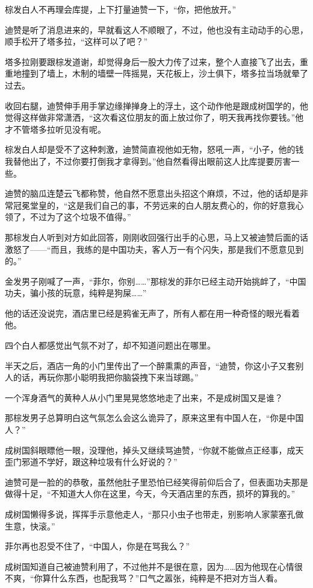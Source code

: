 棕发白人不再理会库提，上下打量迪赞一下，“你，把他放开。”

迪赞是听了消息进来的，早就看这人不顺眼了，不过，他也没有主动动手的心思，顺手松开了塔多拉，“这样可以了吧？”

塔多拉刚要跟棕发道谢，却觉得身后一股大力传了过来，整个人直接飞了出去，重重地撞到了墙上，木制的墙壁一阵摇晃，天花板上，沙土俱下，塔多拉当场就晕了过去。

收回右腿，迪赞伸手用手掌边缘掸掸身上的浮土，这个动作他是跟成树国学的，他觉得这样做非常潇洒，“这次看这位朋友的面上放过你了，明天我再找你要钱。”他才不管塔多拉听见没有呢。

棕发白人却是受不了这种刺激，迪赞简直视他如无物，怒吼一声，“小子，他的钱我替他出了，不过你要打倒我才拿得到。”他自然看得出眼前这人比库提要厉害一些。

迪赞的脑瓜连楚云飞都称赞，他自然不愿意出头招这个麻烦，不过，他的话却是非常冠冕堂皇的，“这是我们自己的事，不劳远来的白人朋友费心的，你的好意我心领了，不过为了这个垃圾不值得。”

那棕发白人听到对方如此回答，刚刚收回强行出手的心思，马上又被迪赞后面的话激怒了——“而且，我练的是中国功夫，客人万一有个闪失，那是我们不愿意见到的。”

金发男子刚喊了一声，“菲尔，你别……”那棕发的菲尔已经主动开始挑衅了，“中国功夫，骗小孩的玩意，纯粹是狗屎……”

他的话还没说完，酒店里已经是鸦雀无声了，所有人都在用一种奇怪的眼光看着他。

四个白人都感觉出气氛不对了，却不知道问题出在哪里。

半天之后，酒店一角的小门里传出了一个醉熏熏的声音，“迪赞，你这小子又套别人的话，再玩你那小聪明我把你脑袋拽下来当球踢。”

一个浑身酒气的黄种人从小门里晃晃悠悠地走了出来，不是成树国又是谁？

那棕发男子总算明白这气氛怎么会这么诡异了，原来这里有中国人在，“你是中国人？”

成树国斜眼瞟他一眼，没理他，掉头又继续骂迪赞，“你就不能做点正经事，成天歪门邪道不学好，跟这种垃圾有什么好说的？”

迪赞可是一脸的的恭敬，虽然他肚子里恐怕已经笑得前仰后合了，但表面功夫那是做得十足，“不知道大人你在这里，今天，今天酒店里的东西，损坏的算我的。”

成树国懒得多说，挥挥手示意他走人，“那只小虫子也带走，别影响人家蒙塞孔做生意，快滚。”

菲尔再也忍受不住了，“中国人，你是在骂我么？”

成树国知道自己被迪赞利用了，不过他并不是很在意，因为……因为他现在心情很不爽，“你算什么东西，也配我骂？”口气之嚣张，纯粹是不把对方当人看。

